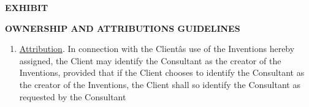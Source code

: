 \documentclass[12pt]{article}
\begin{document}
\begin{center}
\label{exhibitC}
\vspace{1.5cm}
{\huge\bfseries EXHIBIT  \par}
\vspace{1cm}
{\huge\bfseries \uppercase{OWNERSHIP AND ATTRIBUTIONS Guidelines} \par}
\end{center}
\begin{enumerate}
    \item     \underline{Attribution}. In connection with the Clientâs use of the Inventions hereby assigned, the Client
        may identify the Consultant as the creator of the Inventions, provided that if the Client chooses to identify the Consultant as the creator of the Inventions, the Client shall so identify the Consultant as requested by the Consultant
\end{enumerate}
\end{document}
